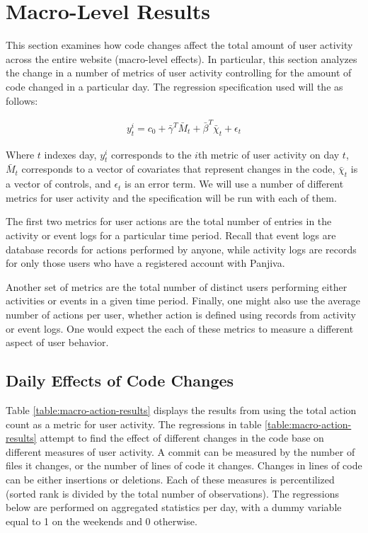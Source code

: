 \documentclass[10pt]{article}
\begin{document}
\section{Macro-Level Results}

This section examines how code changes affect the total amount of user activity across the entire website (macro-level effects). In particular, this section analyzes the change in a number of metrics of user activity controlling for the amount of code changed in a particular day. The regression specification used will the as follows:

\begin{eqnarray}
y^i_{t} = c_0 + \bar{\gamma}^T \bar{M}_t + \bar{\beta}^T \bar{\chi}_t + \epsilon_t
\end{eqnarray}

Where $t$ indexes day, $y^i_t$ corresponds to the $i$th metric of user activity on day $t$, $\bar{M}_t$ corresponds to a vector of covariates that represent changes in the code, $\bar{\chi}_t$ is a vector of controls, and $\epsilon_t$ is an error term. We will use a number of different metrics for user activity and the specification will be run with each of them. 

The first two metrics for user actions are the total number of entries in the activity or event logs for a particular time period. Recall that event logs are database records for actions performed by anyone, while activity logs are records for only those users who have a registered account with Panjiva.

Another set of metrics are the total number of distinct users performing either activities or events in a given time period. Finally, one might also use the average number of actions per user, whether action is defined using records from activity or event logs. One would expect the each of these metrics to measure a different aspect of user behavior. 

\subsection{Daily Effects of Code Changes}

Table \ref{table:macro-action-results} displays the results from using the total action count as a metric for user activity. The regressions in table \ref{table:macro-action-results} attempt to find the effect of different changes in the code base on different measures of user activity. A commit can be measured by the number of files it changes, or the number of lines of code it changes. Changes in lines of code can be either insertions or deletions. Each of these measures is percentilized (sorted rank is divided by the total number of observations). The regressions below are performed on aggregated statistics per day, with a dummy variable equal to 1 on the weekends and 0 otherwise.  
\end{document}
